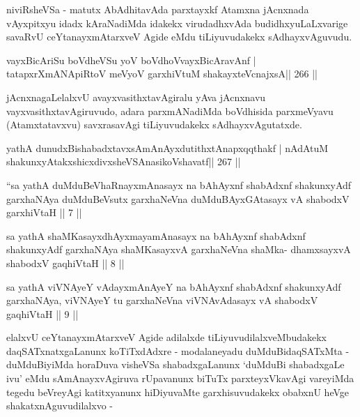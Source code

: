 \begin{artha}
niviRsheVSa - matutx AbAdhitavAda parxtayxkf Atamxna jAcnxnada vAyxpitxyu idadx kAraNadiMda idakekx virudadhxvAda budidhxyuLaLxvarige savaRvU ceYtanayxmAtarxveV Agide eMdu tiLiyuvudakekx sAdhayxvAguvudu.
\end{artha}

\begin{shl}
vayxBicAriSu boVdheVSu yoV boVdhoV\s vayxBicAravAnf |
tatapxrXmANApiRtoV meVyoV garxhiVtuM shakayxteV\s cnajxsA\hfill || 266 ||
\end{shl}

\begin{artha}
jAcnxnagaLelalxvU avayxvasithxtavAgiralu yAva jAcnxnavu vayxvasithxtavAgiruvudo, adara parxmANadiMda boVdhisida parxmeVyavu (Atamxtatavxvu) savxrasavAgi tiLiyuvudakekx sAdhayxvAgutatxde.
\end{artha}


\begin{shl}
yathA dunudxBishabadxtavxsAmAnAyxdutithxtAnapxqqthakf |
nA\s\s dAtuM shakunxyAtakxshicxdivxsheVSAnasikoVshavatf\hfill || 267 ||
\end{shl}



\begin{kandikeshl}
``sa yathA duMduBeVhaRnayxmAnasayx na bAhAyxnf shabAdxnf
shakunxyAdf garxhaNAya duMduBeVsutx garxhaNeVna
duMduBAyxGAtasayx vA shabodxV garxhiVtaH || 7 ||
\end{kandikeshl}

\begin{kandikeshl}
sa yathA shaMKasayxdhAyxmayamAnasayx na bAhAyxnf shabAdxnf
shakunxyAdf garxhaNAya shaMKasayxvA garxhaNeVna shaMka-
dhamxsayxvA shabodxV gaqhiVtaH || 8 ||
\end{kandikeshl}

\begin{kandikeshl}
sa yathA viVNAyeY vAdayxmAnAyeY na bAhAyxnf
shabAdxnf shakunxyAdf garxhaNAya, viVNAyeY tu garxhaNeVna
viVNAvAdasayx vA shabodxV gaqhiVtaH || 9 ||
\end{kandikeshl}

\begin{artha}
elalxvU ceYtanayxmAtarxveV Agide adilalxde tiLiyuvudilalxveMbudakekx daqSATxnatxgaLanunx koTiTxdAdxre - modalaneyadu duMduBidaqSATxMta - duMduBiyiMda horaDuva visheVSa shabadxgaLanunx `duMduBi shabadxgaLe ivu' eMdu sAmAnayxvAgiruva rUpavanunx biTuTx parxteyxVkavAgi vareyiMda tegedu beVreyAgi katitxyanunx hiDiyuvaMte garxhisuvudakekx obabxnU heVge shakatxnAguvudilalxvo -
\end{artha}

